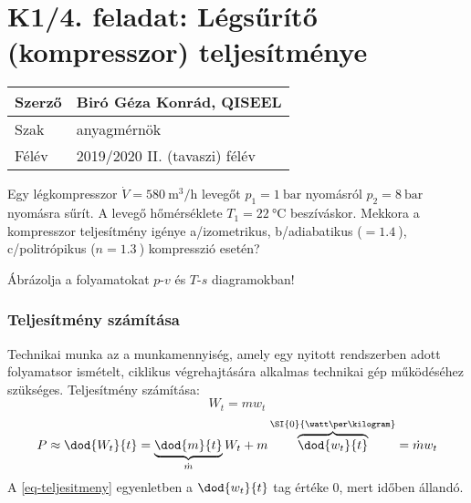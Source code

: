 \section*{K1/4. feladat: Légsűrítő (kompresszor) teljesítménye} 
\begin{tabular}{ | p{2cm} | p{14cm} | } 
	\hline
	Szerző & Biró Géza Konrád, 	QISEEL \\ 
	\hline
	Szak & anyagmérnök\\ 
	\hline
	Félév & 2019/2020 II. (tavaszi) félév \\ 
	\hline
\end{tabular}
\vspace{0.5cm}

\noindent  Egy légkompresszor $\dot{V} = \SI{580}{\meter\cubed\per\hour}$ levegőt $p_1=\SI{1}{\bar}$ nyomásról $p_2=\SI{8}{\bar}$ nyomásra sűrít. A levegő hőmérséklete $T_1=\SI{22}{\celsius}$ beszíváskor. Mekkora a kompresszor teljesítmény igénye a/izometrikus, b/adiabatikus  ($=\SI{1,4}{}$), c/politrópikus ($n = \SI{1,3}{} $) kompresszió esetén? 

\vspace{2mm}
\noindent Ábrázolja a folyamatokat $p$-$v$ és $T$-$s$ diagramokban!



\subsubsection{Teljesítmény számítása}
Technikai munka az a munkamennyiség, amely egy nyitott rendszerben adott folyamatsor ismételt, ciklikus végrehajtására alkalmas technikai gép működéséhez szükséges.
Teljesítmény számítása:
\begin{equation*}
	W_t=mw_t
\end{equation*}
\begin{equation}
P\approx \dod{W_t}{t}=\underbrace{\dod{m}{t} }_{\dot{m}} W_t + m \overbrace{ \dod{w_t}{t}}^{\SI{0}{\watt\per\kilogram}}=\dot{m} w_t
\label{eq-teljesitmeny}
\end{equation}
A \ref{eq-teljesitmeny} egyenletben a $\dod{w_t}{t}$ tag értéke 0, mert időben állandó.



\noindent\hrulefill
